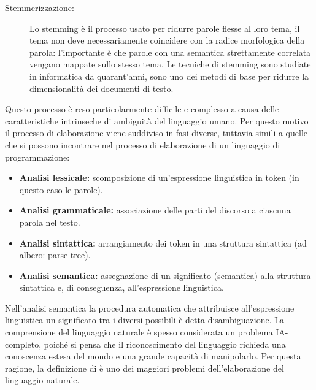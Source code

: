 \documentclass{article}
\theoremstyle{plain}
\theoremstyle{definition}
\begin{document}
\begin{description}
\item [Stemmerizzazione:]Lo stemming è il processo usato per ridurre parole flesse al loro tema, il tema non deve necessariamente coincidere con la radice morfologica della parola: l'importante è che parole con una semantica strettamente correlata vengano mappate sullo stesso tema. Le tecniche di stemming sono studiate in informatica da quarant'anni, sono uno dei metodi di base per ridurre la dimensionalità dei documenti di testo.
\end{description}

Questo processo è reso particolarmente difficile e complesso a causa delle caratteristiche intrinseche di ambiguità del linguaggio umano. Per questo motivo il processo di elaborazione viene suddiviso in fasi diverse, tuttavia simili a quelle che si possono incontrare nel processo di elaborazione di un linguaggio di programmazione:


\begin{itemize}
\item \textbf{Analisi lessicale:} scomposizione di un'espressione linguistica in token (in questo caso le parole).
\item \textbf{Analisi grammaticale:} associazione delle parti del discorso a ciascuna parola nel testo.
\item \textbf{Analisi sintattica:} arrangiamento dei token in una struttura sintattica (ad albero: parse tree).
\item  \textbf{Analisi semantica:} assegnazione di un significato (semantica) alla struttura sintattica e, di conseguenza, all'espressione linguistica.
\end{itemize}

Nell'analisi semantica la procedura automatica che attribuisce all'espressione linguistica un significato tra i diversi possibili è detta disambiguazione.
La comprensione del linguaggio naturale è spesso considerata un problema IA-completo, poiché si pensa che il riconoscimento del linguaggio richieda una conoscenza estesa del mondo e una grande capacità di manipolarlo. Per questa ragione, la definizione di  è uno dei maggiori problemi dell'elaborazione del linguaggio naturale.\footnotemark
{}
\end{document}
